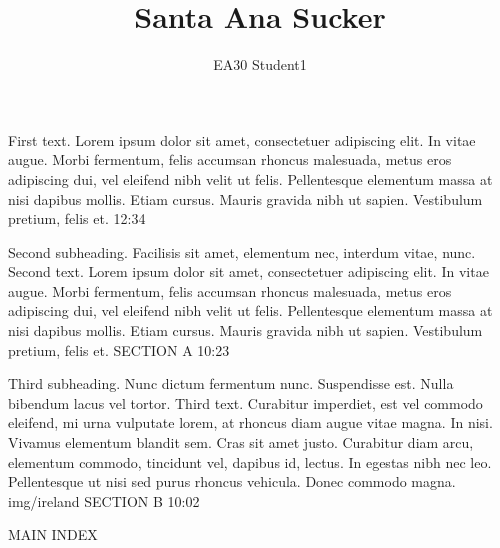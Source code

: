 \documentclass[10pt,final,hyphenatedtitles]{papertex}\usepackage[]{graphicx}\usepackage[]{color}
\author{EA30 Student1}
\title{Santa Ana Sucker}
\begin{document}

\begin{frontpage}

						{First text. Lorem ipsum dolor sit amet, consectetuer adipiscing elit. In vitae augue. Morbi fermentum, felis accumsan rhoncus malesuada, metus eros adipiscing dui, vel eleifend nibh velit ut felis. Pellentesque elementum massa at nisi dapibus mollis. Etiam cursus. Mauris gravida nibh ut sapien. Vestibulum pretium, felis et.}%
						{12:34}

%
						{Second subheading. Facilisis sit amet, elementum nec, interdum vitae, nunc.}%
						{Second text. Lorem ipsum dolor sit amet, consectetuer adipiscing elit. In vitae augue. Morbi fermentum, felis accumsan rhoncus malesuada, metus eros adipiscing dui, vel eleifend nibh velit ut felis. Pellentesque elementum massa at nisi dapibus mollis. Etiam cursus. Mauris gravida nibh ut sapien. Vestibulum pretium, felis et.}%
						{SECTION A}%
						{10:23}

%
					{Third subheading. Nunc dictum fermentum nunc. Suspendisse est. Nulla bibendum lacus vel tortor.}%
					{Third text. Curabitur imperdiet, est vel commodo eleifend, mi urna vulputate lorem, at rhoncus diam augue vitae magna. In nisi. Vivamus elementum blandit sem. Cras sit amet justo. Curabitur diam arcu, elementum commodo, tincidunt vel, dapibus id, lectus. In egestas nibh nec leo. Pellentesque ut nisi sed purus rhoncus vehicula. Donec commodo magna.}%
					{img/ireland}%
					{SECTION B}%
					{10:02}

\begin{indexblock}{MAIN INDEX}



\end{indexblock}


\end{frontpage}
\end{document}
